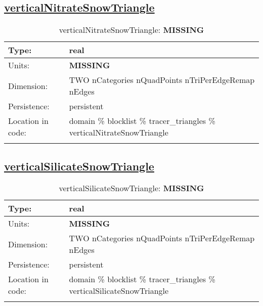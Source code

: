 \subsection[verticalNitrateSnowTriangle]{\hyperref[sec:var_tab_tracer_triangles]{verticalNitrateSnowTriangle}}
\label{subsec:var_sec_tracer_triangles_verticalNitrateSnowTriangle}
\begin{center}
\begin{longtable}{| p{2.0in} | p{4.0in} |}
        \hline 
        Type: & real \\
        \hline 
        Units: & {\bf \color{red} MISSING} \\
        \hline 
        Dimension: & TWO nCategories nQuadPoints nTriPerEdgeRemap nEdges \\
        \hline 
        Persistence: & persistent \\
        \hline 
         Location in code: & domain \% blocklist \% tracer\_triangles \% verticalNitrateSnowTriangle \\
         \hline 
    \caption{verticalNitrateSnowTriangle: {\bf \color{red} MISSING}}
\end{longtable}
\end{center}
\subsection[verticalSilicateSnowTriangle]{\hyperref[sec:var_tab_tracer_triangles]{verticalSilicateSnowTriangle}}
\label{subsec:var_sec_tracer_triangles_verticalSilicateSnowTriangle}
\begin{center}
\begin{longtable}{| p{2.0in} | p{4.0in} |}
        \hline 
        Type: & real \\
        \hline 
        Units: & {\bf \color{red} MISSING} \\
        \hline 
        Dimension: & TWO nCategories nQuadPoints nTriPerEdgeRemap nEdges \\
        \hline 
        Persistence: & persistent \\
        \hline 
         Location in code: & domain \% blocklist \% tracer\_triangles \% verticalSilicateSnowTriangle \\
         \hline 
    \caption{verticalSilicateSnowTriangle: {\bf \color{red} MISSING}}
\end{longtable}
\end{center}
